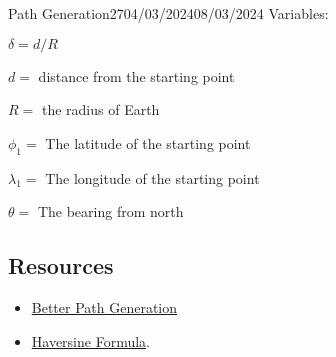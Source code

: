\documentclass[12pt]{article}
\begin{document}
\begin{logbook-entry}{Path Generation}{27}{04/03/2024}{08/03/2024}
Variables:

$\delta = d / R$

$d = $ distance from the starting point

$R = $ the radius of Earth

$\phi_1 = $ The latitude of the starting point

$\lambda_1 = $ The longitude of the starting point

$\theta = $ The bearing from north

\subsection*{Resources}
\begin{itemize}
    \item \href{https://stackoverflow.com/questions/14263284/create-non-intersecting-polygon-passing-through-all-given-points}{Better Path Generation}
    \item \href{https://www.movable-type.co.uk/scripts/latlong.html}{Haversine Formula}.
\end{itemize}
\end{logbook-entry}
\end{document}
